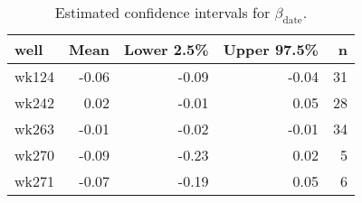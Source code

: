 \begin{table}[ht]
\centering
\begin{tabular}{lrrrr}
  \hline
well & Mean & Lower 2.5\% & Upper 97.5\% & n \\ 
  \hline
wk124 & -0.06 & -0.09 & -0.04 &  31 \\ 
  wk242 & 0.02 & -0.01 & 0.05 &  28 \\ 
  wk263 & -0.01 & -0.02 & -0.01 &  34 \\ 
  wk270 & -0.09 & -0.23 & 0.02 &   5 \\ 
  wk271 & -0.07 & -0.19 & 0.05 &   6 \\ 
   \hline
\end{tabular}
\caption{Estimated confidence intervals for $\beta_\text{date}$.} 
\label{tab:beta_date}
\end{table}
